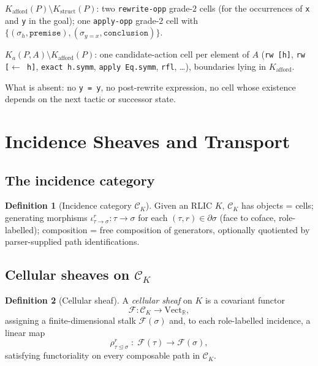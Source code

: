 \documentclass[11pt]{article}
\theoremstyle{definition}
\newtheorem{definition}{Definition}[section]
\theoremstyle{plain}
\newcommand{\R}{\mathbb{R}}
\newcommand{\Vect}{\mathrm{Vect}}
\newcommand{\Kstruct}{K_{\mathrm{struct}}}
\newcommand{\Kafford}{K_{\mathrm{afford}}}
\newcommand{\role}[1]{\texttt{#1}}
\newcommand{\catK}{\mathcal{C}_K}
\begin{document}
$\Kafford(P) \setminus \Kstruct(P)$: two \role{rewrite-opp} grade-$2$ cells (for the occurrences of \texttt{x} and \texttt{y} in the goal); one \role{apply-opp} grade-$2$ cell with $\{(\sigma_h, \role{premise}), (\sigma_{y=x}, \role{conclusion})\}$.

$K_a(P,A) \setminus \Kafford(P)$: one candidate-action cell per element of $A$ (\texttt{rw [h]}, \texttt{rw [\(\leftarrow\) h]}, \texttt{exact h.symm}, \texttt{apply Eq.symm}, \texttt{rfl}, \ldots), boundaries lying in $\Kafford$.

What is absent: no \texttt{y = y}, no post-rewrite expression, no cell whose existence depends on the next tactic or successor state.

\section{Incidence Sheaves and Transport}\label{sec:sheaves}

\subsection{The incidence category}

\begin{definition}[Incidence category $\catK$]\label{def:catK}
Given an RLIC $K$, $\catK$ has objects = cells; generating morphisms $\iota^r_{\tau \to \sigma}\colon \tau \to \sigma$ for each $(\tau, r) \in \partial \sigma$ (face to coface, role-labelled); composition = free composition of generators, optionally quotiented by parser-supplied path identifications.
\end{definition}

\subsection{Cellular sheaves on $\catK$}

\begin{definition}[Cellular sheaf]\label{def:sheaf}
A \emph{cellular sheaf} on $K$ is a covariant functor
\[
\mathcal{F}\colon \catK \longrightarrow \Vect_{\R},
\]
assigning a finite-dimensional stalk $\mathcal{F}(\sigma)$ and, to each role-labelled incidence, a linear map
\[
\rho^r_{\tau \trianglelefteq \sigma}\;\colon\; \mathcal{F}(\tau) \to \mathcal{F}(\sigma),
\]
satisfying functoriality on every composable path in $\catK$.
\end{definition}
\end{document}
